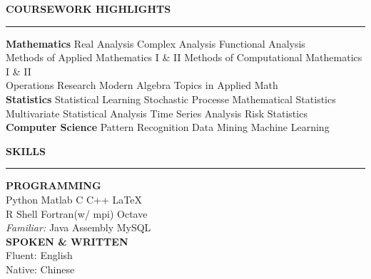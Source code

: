 \documentclass[11pt,A4]{article}
\newcommand{\cvsection}[1]
{
	\begin{center}
		\large\textcolor{sectcol}{\textbf{#1}}
	\end{center}
}
\begin{document}
\newpage


\cvsection{COURSEWORK HIGHLIGHTS}
\vspace{-18pt}
\textcolor{softcol}{\hrule}
\vspace{6pt}

\textbf{Mathematics}
Real Analysis \textbullet{} Complex Analysis \textbullet{} Functional Analysis \\
Methods of Applied Mathematics I \& II \textbullet{} Methods of Computational Mathematics I \& II \\
Operations Research \textbullet{} Modern Algebra \textbullet{} Topics in Applied Math\\

\textbf{Statistics}
Statistical Learning \textbullet{} Stochastic Processe \textbullet{} Mathematical Statistics \\
Multivariate Statistical Analysis \textbullet{} Time Series Analysis \textbullet{} Risk Statistics\\

\textbf{Computer Science}
Pattern Recognition \textbullet{} Data Mining \textbullet{} Machine Learning\\


\cvsection{SKILLS}
\vspace{-18pt}
\textcolor{softcol}{\hrule}
\vspace{6pt}

\textbf{PROGRAMMING}\\
Python \textbullet{} Matlab \textbullet{} C \textbullet{} C++ \textbullet{} \LaTeX\ \\
R \textbullet{} Shell \textbullet{} Fortran(w/ mpi) \textbullet{} Octave\\
\textit{Familiar:}
Java \textbullet{} Assembly \textbullet{} MySQL\\

\textbf{SPOKEN \& WRITTEN}\\
Fluent: English \\
Native: Chinese\\
\end{document}
